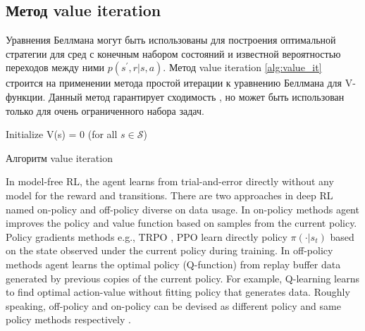  
\subsection{Метод value iteration}

Уравнения Беллмана могут быть использованы для построения оптимальной стратегии для сред с конечным набором состояний и известной вероятностью переходов между ними $p(s^{\prime}, r|s, a)$. Метод value iteration \ref{alg:value_it} строится на применении метода простой итерации к уравнению Беллмана для V-функции. Данный метод гарантирует сходимость \cite{Sutton1998}, но может быть использован только для очень ограниченного набора задач.

\begin{algorithm}[ht]
	\SetAlgoLined
	Initialize V(s) = 0 (for all $s \in \mathcal{S}$)\;
	\caption{Алгоритм value iteration}
	\label{alg:value_it}

\end{algorithm}

In model-free RL, the agent learns from trial-and-error directly without any model for the reward and transitions. There are two approaches in deep RL named on-policy and off-policy diverse on data usage. In on-policy methods agent improves the policy and value function based on samples from the current policy. Policy gradients methods \cite{rl_book} e.g., TRPO \cite{trpo}, PPO \cite{ppo} learn directly policy $\pi(\cdot|s_t)$ based on the state observed under the current policy during training. In off-policy methods agent learns the optimal policy (Q-function) from replay buffer data generated by previous copies of the current policy. For example, Q-learning learns to find optimal action-value without fitting policy that generates data. Roughly speaking, off-policy and on-policy can be devised as different policy and same policy methods respectively \cite{rl_book, RL_review}. 


